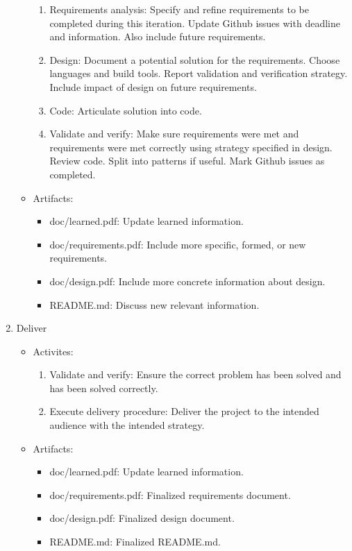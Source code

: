 \documentclass{article}
\begin{document}
\begin{enumerate}
\begin{itemize}
\begin{enumerate}
				\item Requirements analysis: Specify and refine
					requirements to be completed during this
					iteration. Update Github issues with
					deadline and information. Also include
					future requirements.
				\item Design: Document a potential solution for
					the requirements. Choose languages and
					build tools. Report validation and
					verification strategy. Include impact of
					design on future requirements.
				\item Code: Articulate solution into code.
				\item Validate and verify: Make sure
					requirements were met and requirements
					were met correctly using strategy
					specified in design. Review code. Split
					into patterns if useful. Mark Github
					issues as completed.
			\end{enumerate}
			\item Artifacts: \begin{itemize}
				\item doc/learned.pdf: Update learned
					information.
				\item doc/requirements.pdf: Include more
					specific, formed, or new requirements.
				\item doc/design.pdf: Include more concrete
					information about design.
				\item README.md: Discuss new relevant
					information.
			\end{itemize}
		\end{itemize}
	\item Deliver \begin{itemize}
		\item Activites: \begin{enumerate}
			\item Validate and verify: Ensure the correct problem
				has been solved and has been solved correctly.
			\item Execute delivery procedure: Deliver the project to
				the intended audience with the intended
				strategy.
		\end{enumerate}
		\item Artifacts: \begin{itemize}
			\item doc/learned.pdf: Update learned
				information.
			\item doc/requirements.pdf: Finalized requirements
				document.
			\item doc/design.pdf: Finalized design document.
			\item README.md: Finalized README.md.
		\end{itemize}
	\end{itemize}
\end{enumerate}
\end{document}
